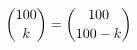 \documentclass[preview]{standalone}
\begin{document}
\begin{align*}
\special{dvisvgm:raw <g id='unique000'>}\binom{100}{k}=\binom{100}{100-k}\special{dvisvgm:raw </g>}
\end{align*}
\end{document}
